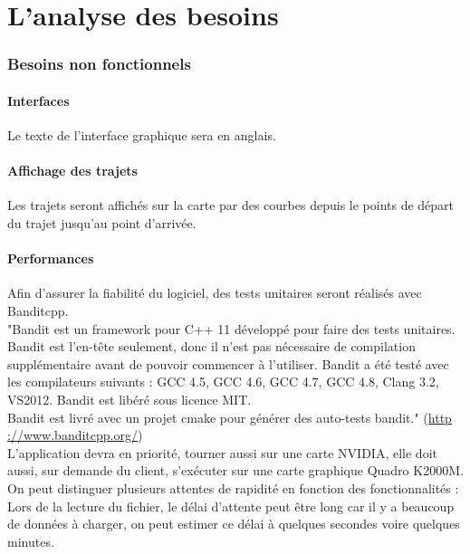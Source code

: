 \documentclass[12pt]{article}
\begin{document}
\part{L'analyse des besoins}

	\section{Besoins non fonctionnels}
		\subsection{Interfaces}
		Le texte de l’interface graphique sera en anglais.

		\subsection{Affichage des trajets}
		Les trajets seront affichés sur la carte par des courbes depuis le points de départ du
		trajet jusqu’au point d’arrivée.

		\subsection{Performances}
		Afin d’assurer la fiabilité du logiciel, des tests unitaires seront réalisés avec
		Banditcpp.\\
		"Bandit est un framework pour C++ 11 développé pour faire des tests unitaires. Bandit est
		l’en-tête seulement, donc il n’est pas nécessaire de compilation supplémentaire avant de
		pouvoir commencer à l’utiliser. Bandit a été testé avec les compilateurs suivants :
		GCC 4.5, GCC 4.6, GCC 4.7, GCC 4.8, Clang 3.2, VS2012.
		Bandit est libéré sous licence MIT. \\
		Bandit est livré avec un projet cmake pour générer des
		auto-tests bandit."
		(\url{http ://www.banditcpp.org/})\\
	
		L’application devra en priorité, tourner aussi sur une carte NVIDIA, elle doit aussi,
		sur demande du client, s’exécuter sur une carte graphique Quadro K2000M.\\
		
		On peut distinguer plusieurs attentes de rapidité en fonction des fonctionnalités :
		Lors de la lecture du fichier, le délai d’attente peut être long car il y a
		beaucoup de données à charger, on peut estimer ce délai à quelques secondes voire
		quelques minutes. \\
		
\end{document}
